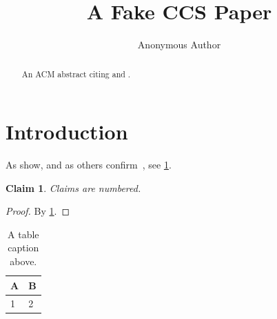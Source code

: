 \documentclass[sigconf,anonymous,review]{acmart}
\newtheorem{claim}{Claim}
\begin{document}
\title{A Fake CCS Paper}
\author{Anonymous Author}
\begin{abstract}
An ACM abstract citing \citet{AcmA} and \citep{AcmB}.
\end{abstract}
\maketitle
\section{Introduction}\label{sec:intro}
As \citet{AcmA} show, and as others confirm~\citep{AcmA,AcmB}, see \cref{cl:one}.
\begin{claim}\label{cl:one}
Claims are numbered.
\end{claim}
\begin{proof}
By \cref{sec:intro}.
\end{proof}
\begin{table}
\caption{A table caption above.}\label{tab:t}
\begin{tabular}{ll} \toprule A & B \\ \midrule 1 & 2 \\ \bottomrule \end{tabular}
\end{table}


\end{document}
